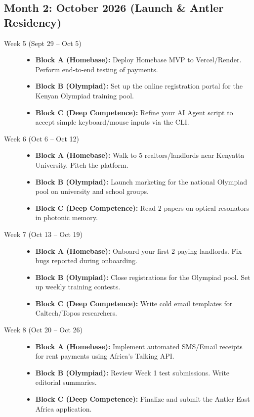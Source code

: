 \documentclass[11pt,a4paper]{article}
\begin{document}
\subsection{Month 2: October 2026 (Launch \& Antler Residency)}
\begin{description}
    \item[Week 5 (Sept 29 -- Oct 5)] \hfill
    \begin{itemize}
        \item \textbf{Block A (Homebase):} Deploy Homebase MVP to Vercel/Render. Perform end-to-end testing of payments.
        \item \textbf{Block B (Olympiad):} Set up the online registration portal for the Kenyan Olympiad training pool.
        \item \textbf{Block C (Deep Competence):} Refine your AI Agent script to accept simple keyboard/mouse inputs via the CLI.
    \end{itemize}
    
    \item[Week 6 (Oct 6 -- Oct 12)] \hfill
    \begin{itemize}
        \item \textbf{Block A (Homebase):} Walk to 5 realtors/landlords near Kenyatta University. Pitch the platform.
        \item \textbf{Block B (Olympiad):} Launch marketing for the national Olympiad pool on university and school groups.
        \item \textbf{Block C (Deep Competence):} Read 2 papers on optical resonators in photonic memory.
    \end{itemize}
    
    \item[Week 7 (Oct 13 -- Oct 19)] \hfill
    \begin{itemize}
        \item \textbf{Block A (Homebase):} Onboard your first 2 paying landlords. Fix bugs reported during onboarding.
        \item \textbf{Block B (Olympiad):} Close registrations for the Olympiad pool. Set up weekly training contests.
        \item \textbf{Block C (Deep Competence):} Write cold email templates for Caltech/Topos researchers.
    \end{itemize}
    
    \item[Week 8 (Oct 20 -- Oct 26)] \hfill
    \begin{itemize}
        \item \textbf{Block A (Homebase):} Implement automated SMS/Email receipts for rent payments using Africa's Talking API.
        \item \textbf{Block B (Olympiad):} Review Week 1 test submissions. Write editorial summaries.
        \item \textbf{Block C (Deep Competence):} Finalize and submit the Antler East Africa application.
    \end{itemize}
\end{description}
\end{document}
